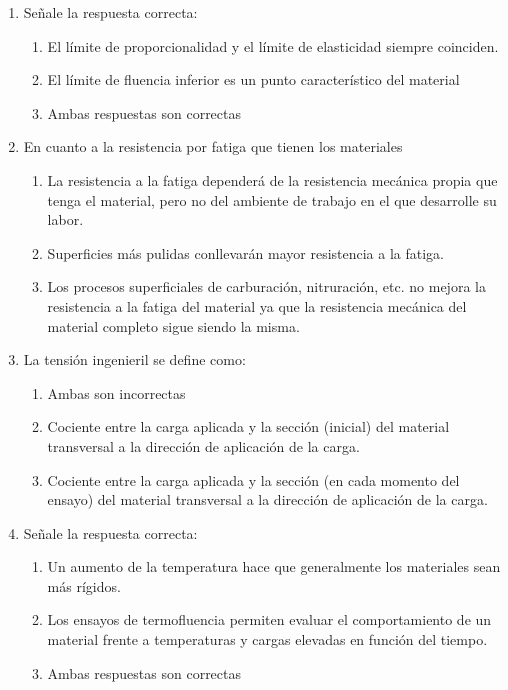 \begin{enumerate}[label=\textbf{\arabic*.}]
    \item Señale la respuesta correcta:
          \begin{enumerate}[label=\alph*.]
              \item El límite de proporcionalidad y el límite de elasticidad siempre coinciden.
              \item \textcolor{red!85!black}{El límite de fluencia inferior es un punto característico del material}
              \item Ambas respuestas son correctas
          \end{enumerate}

    \item En cuanto a la resistencia por fatiga que tienen los materiales
          \begin{enumerate}[label=\alph*.]
              \item La resistencia a la fatiga dependerá de la resistencia mecánica propia que tenga el material, pero no del ambiente de trabajo en el que desarrolle su labor.
              \item \textcolor{red!85!black}{Superficies más pulidas conllevarán mayor resistencia a la fatiga.}
              \item Los procesos superficiales de carburación, nitruración, etc. no mejora la resistencia a la fatiga del material ya que la resistencia mecánica del material completo sigue siendo la misma.
          \end{enumerate}

    \item La tensión ingenieril se define como:
          \begin{enumerate}[label=\alph*.]
              \item Ambas son incorrectas
              \item \textcolor{red!85!black}{Cociente entre la carga aplicada y la sección (inicial) del material transversal a la dirección de aplicación de la carga.}
              \item Cociente entre la carga aplicada y la sección (en cada momento del ensayo) del material transversal a la dirección de aplicación de la carga.
          \end{enumerate}

    \item Señale la respuesta correcta:
          \begin{enumerate}[label=\alph*.]
              \item Un aumento de la temperatura hace que generalmente los materiales sean más rígidos.
              \item \textcolor{red!85!black}{Los ensayos de termofluencia permiten evaluar el comportamiento de un material frente a temperaturas y cargas elevadas en función del tiempo.}
              \item Ambas respuestas son correctas
          \end{enumerate}


\end{enumerate}
